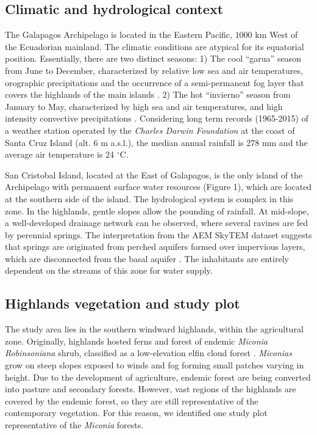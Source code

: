 \documentclass[a4paper,12pt]{article}
\begin{document}
\subsection{Climatic and hydrological context}
The Galapagos Archipelago is located in the Eastern Pacific, $1000$ $\mathrm{km}$ West of the Ecuadorian mainland. The climatic conditions are atypical for its equatorial position. Essentially, there are two distinct seasons: 1) The cool “garua” season from June to December, characterized by relative low sea and air temperatures, orographic precipitations and the occurrence of a semi-permanent fog layer that covers the highlands of the main islands \citep{TruemananddOzouville2010, Pryetetal2012a}. 2) The hot “invierno” season from January to May, characterized by high sea and air temperatures, and high intensity convective precipitations \citep{GrantandBoag1980, Dunbaretal1994, TruemananddOzouville2010}. Considering long term records (1965-2015) of a weather station operated by the \emph{Charles Darwin Foundation} at the coast of Santa Cruz Island (alt. 6 m a.s.l.), the median annual rainfall is 278 mm and the average air temperature is 24 $\mathrm{^{\circ}C}$.

San Cristobal Island, located at the East of Galapagos, is the only island of the Archipelago with permanent surface water resources (Figure 1), which are located at the southern side of the island. The hydrological system is complex in this zone. In the highlands, gentle slopes allow the pounding of rainfall. At mid-slope, a well-developed drainage network can be observed, where several ravines are fed by perennial springs. The interpretation from the AEM SkyTEM dataset \cite{dOzouville2007} suggests that springs are originated from perched aquifers formed over impervious layers, which are disconnected from the basal aquifer \citep{Pryetetal2012b, Violetteetal2014}. The inhabitants are entirely dependent on the streams of this zone for water supply. 

\subsection{Highlands vegetation and study plot}
The study area lies in the southern windward highlands, within the agricultural zone. Originally, highlands hosted ferns and forest of endemic \emph{Miconia Robinsoniana} shrub, classified as a low-elevation elfin cloud forest \citep{Pryetetal2012a}. \emph{Miconias} grow on steep slopes exposed to winds and fog forming small patches varying in height. Due to the development of agriculture, endemic forest are being converted into pasture and secondary forests. However, vast regions of the highlands are covered by the endemic forest, so they are still representative of the contemporary vegetation. For this reason, we identified one study plot representative of the \emph{Miconia} forests.
\end{document}
